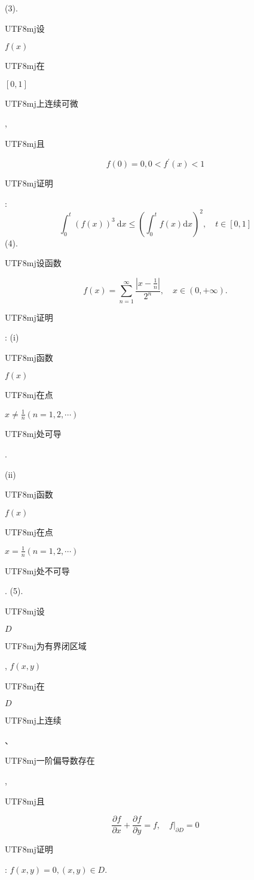 \documentclass[10pt]{article}
\begin{document}
(3). \begin{CJK}{UTF8}{mj}设\end{CJK} $f(x)$ \begin{CJK}{UTF8}{mj}在\end{CJK} $[0,1]$ \begin{CJK}{UTF8}{mj}上连续可微\end{CJK}, \begin{CJK}{UTF8}{mj}且\end{CJK}
$$
f(0)=0,0<f^{\prime}(x)<1
$$
\begin{CJK}{UTF8}{mj}证明\end{CJK}:
$$
\int_{0}^{t}(f(x))^{3} \mathrm{~d} x \leqslant\left(\int_{0}^{t} f(x) \mathrm{d} x\right)^{2}, \quad t \in[0,1]
$$
(4). \begin{CJK}{UTF8}{mj}设函数\end{CJK}
$$
f(x)=\sum_{n=1}^{\infty} \frac{\left|x-\frac{1}{n}\right|}{2^{n}}, \quad x \in(0,+\infty) .
$$
\begin{CJK}{UTF8}{mj}证明\end{CJK}: (i) \begin{CJK}{UTF8}{mj}函数\end{CJK} $f(x)$ \begin{CJK}{UTF8}{mj}在点\end{CJK} $x \neq \frac{1}{n}(n=1,2, \cdots)$ \begin{CJK}{UTF8}{mj}处可导\end{CJK}.

(ii) \begin{CJK}{UTF8}{mj}函数\end{CJK} $f(x)$ \begin{CJK}{UTF8}{mj}在点\end{CJK} $x=\frac{1}{n}(n=1,2, \cdots)$ \begin{CJK}{UTF8}{mj}处不可导\end{CJK}. (5). \begin{CJK}{UTF8}{mj}设\end{CJK} $D$ \begin{CJK}{UTF8}{mj}为有界闭区域\end{CJK}, $f(x, y)$ \begin{CJK}{UTF8}{mj}在\end{CJK} $D$ \begin{CJK}{UTF8}{mj}上连续\end{CJK}、\begin{CJK}{UTF8}{mj}一阶偏导数存在\end{CJK}, \begin{CJK}{UTF8}{mj}且\end{CJK}
$$
\frac{\partial f}{\partial x}+\frac{\partial f}{\partial y}=f,\left.\quad f\right|_{\partial D}=0
$$
\begin{CJK}{UTF8}{mj}证明\end{CJK}: $f(x, y)=0,(x, y) \in D$.
\end{document}
